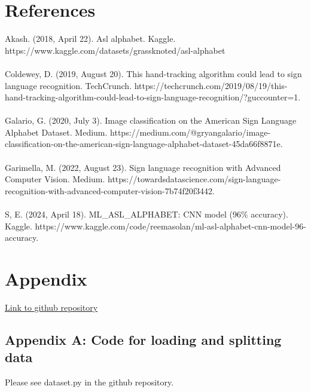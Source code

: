 \documentclass[10pt,twocolumn,letterpaper]{article}
\begin{document}
\section{References}
{\small


    Akash. (2018, April 22). Asl alphabet. Kaggle. https://www.kaggle.com/datasets/grassknoted/asl-alphabet 
    \\\\Coldewey, D. (2019, August 20). This hand-tracking algorithm could lead to sign language recognition. TechCrunch. https://techcrunch.com/2019/08/19/this-hand-tracking-algorithm-could-lead-to-sign-language-recognition/?guccounter=1. 
    \\\\Galario, G. (2020, July 3). Image classification on the American Sign Language Alphabet Dataset. Medium. https://medium.com/@gryangalario/image-classification-on-the-american-sign-language-alphabet-dataset-45da66f8871e.
    \\\\Garimella, M. (2022, August 23). Sign language recognition with Advanced Computer Vision. Medium. https://towardsdatascience.com/sign-language-recognition-with-advanced-computer-vision-7b74f20f3442.
    \\\\S, E. (2024, April 18). ML\_ASL\_ALPHABET: CNN model (96\% accuracy). Kaggle. https://www.kaggle.com/code/reemasolan/ml-asl-alphabet-cnn-model-96-accuracy.
}



\newpage
\section{Appendix}
\href{https://github.com/Tsporer/ASLrecognitionEECS442}{Link to github repository}

\subsection{Appendix A: Code for loading and splitting data}
Please see dataset.py in the github repository.
\end{document}
